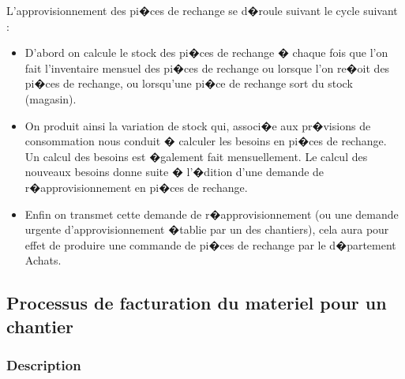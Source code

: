 \documentclass{article}
\begin{document}
						L'approvisionnement des pi�ces de rechange se d�roule suivant le cycle suivant :
						\begin{itemize}
						    \item D'abord on calcule le stock des pi�ces de rechange � chaque fois que l'on fait l'inventaire mensuel des pi�ces de rechange ou lorsque l'on re�oit des pi�ces de rechange, ou lorsqu'une pi�ce de rechange sort du stock (magasin).
						    \item On produit ainsi la variation de stock qui, associ�e aux pr�visions de consommation nous conduit � calculer les besoins en pi�ces de rechange. Un calcul des besoins est �galement fait mensuellement. Le calcul des nouveaux besoins donne suite � l'�dition d'une demande de r�approvisionnement en pi�ces de rechange.
						    \item Enfin on transmet cette demande de r�approvisionnement (ou une demande urgente d'approvisionnement
�tablie par un des chantiers), cela aura pour effet de produire une commande de pi�ces de rechange par le d�partement Achats.
						\end{itemize}
						
				
				
				
		\subsection{Processus de facturation du materiel pour un chantier}
				\subsubsection{Description}
				
\end{document}
